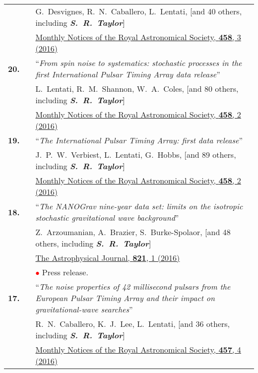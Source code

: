 \documentclass[11pt,letterpaper,sans]{moderncv}
\begin{document}
{\begin{longtable}{rp{0.3cm}p{15.8cm}}
&& G.~Desvignes, R.~N.~Caballero, L.~Lentati, [and 40 others, including \textit{\textbf{S.~R.~Taylor}}] \\ 
&&  \href{http://mnras.oxfordjournals.org/content/458/3/3341}{{\color{color1} Monthly Notices of the Royal Astronomical Society, \textbf{458}, 3 (2016)}} \vspace{0.09cm}\\
\textbf{20.} & & ``\textit{From spin noise to systematics: stochastic processes in the first International Pulsar Timing Array data release}'' \\ 
&& L.~Lentati, R.~M.~Shannon, W.~A.~Coles, [and 80 others, including \textit{\textbf{S.~R.~Taylor}}] \\ 
&&  \href{http://mnras.oxfordjournals.org/content/458/2/2161}{{\color{color1} Monthly Notices of the Royal Astronomical Society, \textbf{458}, 2 (2016)}} \vspace{0.09cm}\\
\textbf{19.} & & ``\textit{The International Pulsar Timing Array: first data release}'' \\ 
&& J.~P.~W.~Verbiest, L.~Lentati, G.~Hobbs, [and 89 others, including \textit{\textbf{S.~R.~Taylor}}] \\ 
&&  \href{http://mnras.oxfordjournals.org/content/458/2/1267}{{\color{color1} Monthly Notices of the Royal Astronomical Society, \textbf{458}, 2 (2016)}} \vspace{0.09cm}\\
\textbf{18.} & & ``\textit{The NANOGrav nine-year data set: limits on the isotropic stochastic gravitational wave background}'' \\ 
&& Z.~Arzoumanian, A.~Brazier, S.~Burke-Spolaor, [and 48 others, including \textit{\textbf{S.~R.~Taylor}}] \\ 
&&  \href{http://iopscience.iop.org/article/10.3847/0004-637X/821/1/13/meta}{{\color{color1} The Astrophysical Journal, \textbf{821}, 1 (2016)}} \\
&& \textcolor{red}{$\bullet$} Press release. \vspace{0.09cm}\\
\textbf{17.} & & ``\textit{The noise properties of 42 millisecond pulsars from the European Pulsar Timing Array and their impact on gravitational-wave searches}'' \\ 
&& R.~N.~Caballero, K.~J.~Lee, L.~Lentati, [and 36 others, including \textit{\textbf{S.~R.~Taylor}}] \\ 
&&  \href{http://mnras.oxfordjournals.org/content/457/4/4421}{{\color{color1} Monthly Notices of the Royal Astronomical Society, \textbf{457}, 4 (2016)}} \vspace{0.09cm}\\

\end{longtable}}
\end{document}
